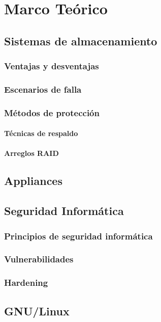   \chapter{Marco Te\'{o}rico}
  \label{chap:cap1}
    \section {Sistemas de almacenamiento}
      \subsection {Ventajas y desventajas}
      \subsection {Escenarios de falla}
      \subsection {M\'{e}todos de protecci\'{o}n}
        \subsubsection {T\'{e}cnicas de respaldo}
        \subsubsection {Arreglos RAID}
    \section {Appliances}
    \section {Seguridad Inform\'{a}tica}
      \subsection {Principios de seguridad inform\'{a}tica}
      \subsection {Vulnerabilidades}
      \subsection {Hardening}
    \section {GNU/Linux}
